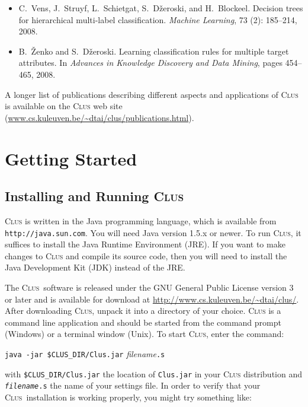 \documentclass[a4paper]{report}
\newcommand{\clus}{\textsc{Clus}}
\begin{document}
\begin{itemize}
\item C.~Vens, J.~Struyf, L.~Schietgat, S.~D{\v z}eroski, and H.~Blockeel.
\newblock Decision trees for hierarchical multi-label classification.
\newblock \emph{Machine Learning}, 73 (2): 185--214, 2008.

\item B.~{\v{Z}}enko and S.~D{\v{z}}eroski.
\newblock Learning classification rules for multiple target attributes.
\newblock In \emph{Advances in Knowledge Discovery and Data Mining}, pages
  454--465, 2008.

\end{itemize}

A longer list of publications describing different aspects and applications of \clus{} is available on the \clus{} web site
(\url{www.cs.kuleuven.be/~dtai/clus/publications.html}).

%
\chapter{Getting Started}

\section{Installing and Running \clus}
\label{sec:run}

\begin{sloppypar}
\clus{} is written in the Java programming language, which is available from {\tt http://java.sun.com}. You will need Java version 1.5.x or newer. To run \clus{}, it suffices to install the Java Runtime Environment (JRE). If you want to make changes to \clus{} and compile its source code, then you will need to install the Java Development Kit (JDK) instead of the JRE.
\end{sloppypar}

The \clus\ software is released under the GNU General Public License version 3 or later and is available for download at \url{http://www.cs.kuleuven.be/~dtai/clus/}. After downloading \clus{}, unpack it into a directory of your choice. \clus{} is a command line application and should be started from the command prompt (Windows) or a terminal window (Unix). To start \clus{}, enter the command:
\begin{flushleft}
\verb^java -jar $CLUS_DIR/Clus.jar^ {\em filename}\verb^.s^
\end{flushleft}

\noindent{}with \verb^$CLUS_DIR/Clus.jar^ the location of \verb^Clus.jar^ in your \clus{} distribution and {\tt {\em filename}.s} the name of your settings file. In order to verify that your \clus\ installation is working properly, you might try something like:
\end{document}
